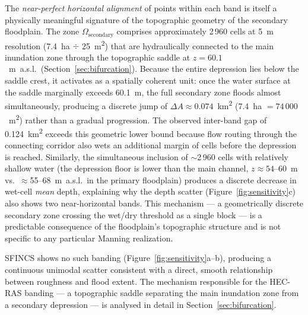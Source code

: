 \documentclass[review,12pt]{elsarticle}
\newcommand{\sfincs}{\textsc{SFINCS}}
\newcommand{\hecras}{\textsc{HEC-RAS}}
\begin{document}
The \emph{near-perfect horizontal alignment} of points within each band is
itself a physically meaningful signature of the topographic geometry of the
secondary floodplain.
The zone $\Omega_{\mathrm{secondary}}$ comprises approximately 2\,960 cells
at 5~m resolution (7.4~ha $\div$ 25~m\textsuperscript{2}) that are
hydraulically connected to the main inundation zone through the topographic
saddle at $z = 60.1$~m~a.s.l.\ (Section~\ref{sec:bifurcation}).
Because the entire depression lies below the saddle crest, it activates as
a spatially coherent unit: once the water surface at the saddle marginally
exceeds 60.1~m, the full secondary zone floods almost simultaneously,
producing a discrete jump of $\Delta A \approx 0.074$~km\textsuperscript{2}
(7.4~ha $= 74\,000$~m\textsuperscript{2}) rather than a gradual progression.
The observed inter-band gap of 0.124~km\textsuperscript{2} exceeds this
geometric lower bound because flow routing through the connecting corridor
also wets an additional margin of cells before the depression is reached.
Similarly, the simultaneous inclusion of $\sim$2\,960 cells with relatively
shallow water (the depression floor is lower than the main channel,
$z \approx 54$--60~m vs.\ $\approx$55--68~m~a.s.l.\ in the primary floodplain)
produces a discrete decrease in wet-cell \emph{mean} depth, explaining why
the depth scatter (Figure~\ref{fig:sensitivity}c) also shows two near-horizontal
bands.
This mechanism --- a geometrically discrete secondary zone crossing the wet/dry
threshold as a single block --- is a predictable consequence of the floodplain's
topographic structure and is not specific to any particular Manning realization.

\sfincs{} shows no such banding (Figure~\ref{fig:sensitivity}a--b), producing
a continuous unimodal scatter consistent with a direct, smooth relationship
between roughness and flood extent.
The mechanism responsible for the \hecras{} banding --- a topographic saddle
separating the main inundation zone from a secondary depression --- is
analysed in detail in Section~\ref{sec:bifurcation}.
\end{document}
